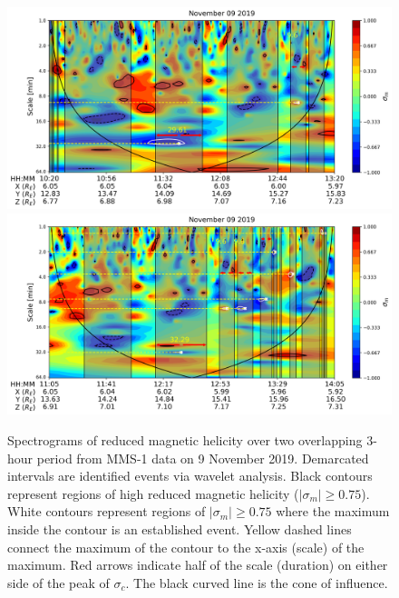 \begin{figure}
    \centering
    \includegraphics[width=\textwidth]{Figures/Spectrograms/magnetichelicity_wave_events_09112019_1020.png}
    \includegraphics[width=\textwidth]{Figures/Spectrograms/magnetichelicity_wave_events_09112019_1105.png}
    \caption[Diagram of wavelet analysis identification algorithm via spectrograms of MHD quantities]{Spectrograms of reduced magnetic helicity over two overlapping 3-hour period from MMS-1 data on 9 November 2019. Demarcated intervals are identified events via wavelet analysis. Black contours represent regions of high reduced magnetic helicity ($|\sigma_m| \geq 0.75$). White contours represent regions of $|\sigma_m| \geq 0.75$ where the maximum inside the contour is an established event. Yellow dashed lines connect the maximum of the contour to the x-axis (scale) of the maximum. Red arrows indicate half of the scale (duration) on either side of the peak of $\sigma_c$. The black curved line is the cone of influence.}
    \label{fig:spectrograms-interval}
\end{figure}

